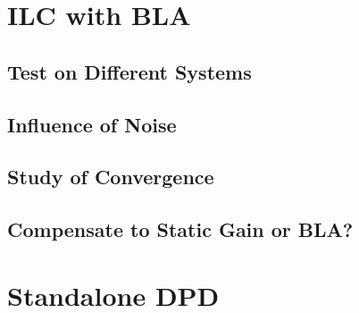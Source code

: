 %
%

\section{ILC with BLA}
	\subsection{Test on Different Systems}
	\subsection{Influence of Noise}
	\subsection{Study of Convergence}
	\subsection{Compensate to Static Gain or BLA?}

\section{Standalone DPD}